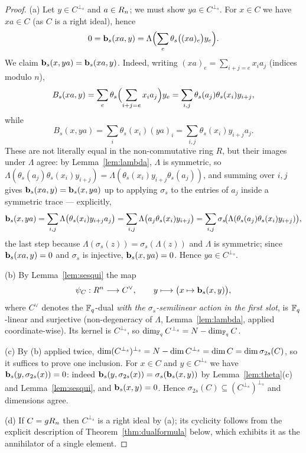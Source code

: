 \begin{proof}
(a) Let $y\in C^{\perp_s}$ and $a\in R_n$; we must show $ya\in C^{\perp_s}$.
For $x\in C$ we have $xa\in C$ (as $C$ is a right ideal), hence
\[
  0=\mathbf b_s(xa,y)=\Lambda\Bigl(\sum_e\theta_s\bigl((xa)_e\bigr)y_e\Bigr).
\]
We claim $\mathbf b_s(x,ya)=\mathbf b_s(xa,y)$. Indeed, writing
$(xa)_e=\sum_{i+j=e}x_ia_j$ (indices modulo $n$),
\[
  B_s(xa,y)=\sum_e\theta_s\Bigl(\sum_{i+j=e}x_ia_j\Bigr)y_e
  =\sum_{i,j}\theta_s(a_j)\theta_s(x_i)y_{i+j},
\]
while
\[
  B_s(x,ya)=\sum_i\theta_s(x_i)(ya)_i
  =\sum_{i,j}\theta_s(x_i)y_{i+j}a_j .
\]
These are not literally equal in the non-commutative ring $R$, but their images
under $\Lambda$ agree: by Lemma~\ref{lem:lambda}, $\Lambda$ is symmetric, so
$\Lambda(\theta_s(a_j)\theta_s(x_i)y_{i+j})
=\Lambda(\theta_s(x_i)y_{i+j}\theta_s(a_j))$, and summing over $i,j$ gives
$\mathbf b_s(xa,y)=\mathbf b_s(x,ya)$ up to applying $\sigma_s$ to the entries of $a_j$
inside a symmetric trace --- explicitly,
\[
  \mathbf b_s(x,ya)=\sum_{i,j}\Lambda\bigl(\theta_s(x_i)y_{i+j}a_j\bigr)
  =\sum_{i,j}\Lambda\bigl(a_j\theta_s(x_i)y_{i+j}\bigr)
  =\sum_{i,j}\sigma_s\!\bigl(\Lambda(\theta_s(a_j)\theta_s(x_i)y_{i+j})\bigr),
\]
the last step because $\Lambda(\sigma_s(z))=\sigma_s(\Lambda(z))$ and
$\Lambda$ is symmetric; since $\mathbf b_s(xa,y)=0$ and $\sigma_s$ is injective,
$\mathbf b_s(x,ya)=0$. Hence $ya\in C^{\perp_s}$.

(b) By Lemma~\ref{lem:sesqui} the map
\[
  \psi_C:R^n\longrightarrow C^{\vee},\qquad
  y\longmapsto\bigl(x\mapsto\mathbf b_s(x,y)\bigr),
\]
where $C^{\vee}$ denotes the $\mathbb F_q$-dual \emph{with the $\sigma_s$-semilinear
action in the first slot}, is $\mathbb F_q$-linear and surjective
(non-degeneracy of $\Lambda$, Lemma~\ref{lem:lambda}, applied coordinate-wise).
Its kernel is $C^{\perp_s}$, so
$\dim_{\mathbb F_q}C^{\perp_s}=N-\dim_{\mathbb F_q}C$.

(c) By (b) applied twice,
$\dim(C^{\perp_s})^{\perp_s}=N-\dim C^{\perp_s}=\dim C=\dim\sigma_{2s}(C)$,
so it suffices to prove one inclusion. For $x\in C$ and $y\in C^{\perp_s}$ we
have $\mathbf b_s(y,\sigma_{2s}(x))=0$: indeed
$\mathbf b_s(y,\sigma_{2s}(x))=\sigma_s(\mathbf b_s(x,y))$ by Lemma~\ref{lem:theta}(c) and
Lemma~\ref{lem:sesqui}, and $\mathbf b_s(x,y)=0$. Hence
$\sigma_{2s}(C)\subseteq(C^{\perp_s})^{\perp_s}$ and dimensions agree.

(d) If $C=gR_n$ then $C^{\perp_s}$ is a right ideal by (a); its cyclicity
follows from the explicit description of Theorem~\ref{thm:dualformula} below,
which exhibits it as the annihilator of a single element.
\end{proof}

